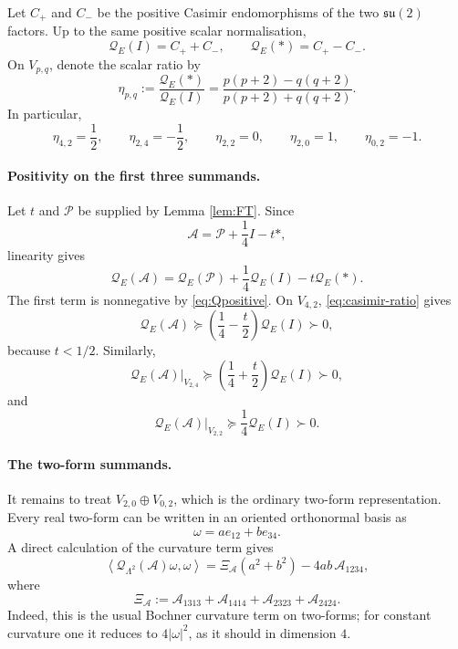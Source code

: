 \documentclass[reqno,11pt]{amsart}
\theoremstyle{definition}
\newcommand{\cA}{\mathcal A}
\newcommand{\cQ}{\mathcal Q}
\newcommand{\cP}{\mathcal P}
\newcommand{\inner}[2]{\left\langle #1,#2\right\rangle}
\begin{document}
Let $C_+$ and $C_-$ be the positive Casimir endomorphisms of the two
$\mathfrak{su}(2)$ factors. Up to the same positive scalar normalisation,
\begin{equation*}
  \cQ_E(I)=C_++C_-,
  \qquad
  \cQ_E(*)=C_+-C_-.
\end{equation*}
On $V_{p,q}$, denote the scalar ratio by
\begin{equation}\label{eq:casimir-ratio}
  \eta_{p,q}:=\frac{\cQ_E(*)}{\cQ_E(I)}
  =\frac{p(p+2)-q(q+2)}{p(p+2)+q(q+2)}.
\end{equation}
In particular,
\begin{equation*}
  \eta_{4,2}=\frac12,
  \qquad
  \eta_{2,4}=-\frac12,
  \qquad
  \eta_{2,2}=0,
  \qquad
  \eta_{2,0}=1,
  \qquad
  \eta_{0,2}=-1.
\end{equation*}

\paragraph{Positivity on the first three summands.}

Let $t$ and $\cP$ be supplied by Lemma \ref{lem:FT}. Since
$$
  \cA=\cP+\frac14I-t*,
$$
linearity gives
\begin{equation}\label{eq:Qsplit}
  \cQ_E(\cA)
  =\cQ_E(\cP)+\frac14\cQ_E(I)-t\cQ_E(*).
\end{equation}
The first term is nonnegative by \eqref{eq:Qpositive}. On $V_{4,2}$,
\eqref{eq:casimir-ratio} gives
$$
  \cQ_E(\cA)
  \succeq
  \left(\frac14-\frac t2\right)\cQ_E(I)
  \succ0,
$$
because $t<1/2$. Similarly,
$$
  \cQ_E(\cA)|_{V_{2,4}}
  \succeq
  \left(\frac14+\frac t2\right)\cQ_E(I)
  \succ0,
$$
and
$$
  \cQ_E(\cA)|_{V_{2,2}}
  \succeq\frac14\cQ_E(I)
  \succ0.
$$

\paragraph{The two-form summands.}

It remains to treat $V_{2,0}\oplus V_{0,2}$, which is the ordinary two-form
representation. Every real two-form can be written in an oriented orthonormal
basis as
$$
  \omega=a e_{12}+b e_{34}.
$$
A direct calculation of the curvature term gives
\begin{equation}\label{eq:two-form-Q}
  \inner{\cQ_{\Lambda^2}(\cA)\omega}{\omega}
  =\Xi_{\cA}(a^2+b^2)-4ab\,\cA_{1234},
\end{equation}
where
$$
  \Xi_{\cA}:=\cA_{1313}+\cA_{1414}+\cA_{2323}+\cA_{2424}.
$$
Indeed, this is the usual Bochner curvature term on two-forms; for constant
curvature one it reduces to $4|\omega|^2$, as it should in dimension $4$.
\end{document}
